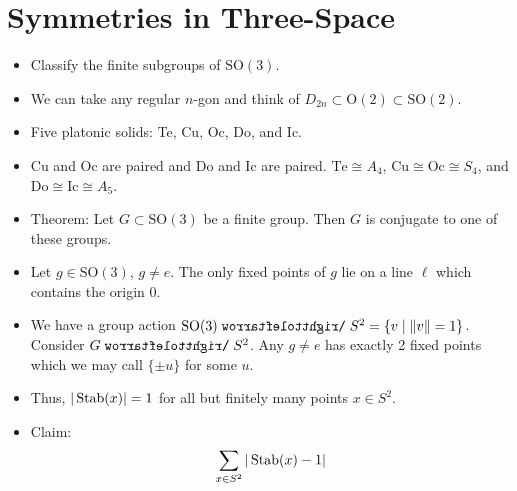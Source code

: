 \documentclass[../notes.tex]{subfiles}
\begin{document}
\section{Symmetries in Three-Space}
\begin{itemize}
    \item {}Classify the finite subgroups of $\text{SO}(3)$.
    \item We can take any regular $n$-gon and think of $D_{2n}\subset\text{O}(2)\subset\text{SO}(2)$.
    \item Five platonic solids: Te, Cu, Oc, Do, and Ic.
    \item Cu and Oc are paired and Do and Ic are paired. $\text{Te}\cong A_4$, $\text{Cu}\cong\text{Oc}\cong S_4$, and $\text{Do}\cong\text{Ic}\cong A_5$.
    \item Theorem: Let $G\subset\text{SO}(3)$ be a finite group. Then $G$ is conjugate to one of these groups.
    \item Let $g\in\text{SO}(3)$, $g\neq e$. The only fixed points of $g$ lie on a line $\ell$ which contains the origin 0.
    \item We have a group action $\text{SO}(3)\acts S^2=\{v\mid\norm{v}=1\}$. Consider $G\acts S^2$. Any $g\neq e$ has exactly 2 fixed points which we may call $\{\pm u\}$ for some $u$.
    \item Thus, $|\operatorname{Stab}(x)|=1$ for all but finitely many points $x\in S^2$.
    \item Claim:
    \begin{equation*}
        \sum_{x\in S^2}|\operatorname{Stab}(x)-1|
    \end{equation*}
\end{itemize}
\end{document}
